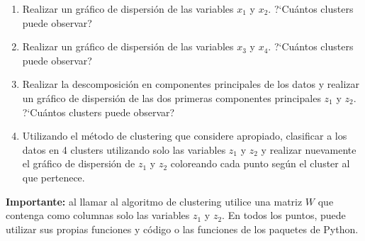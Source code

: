\documentclass[12pt]{article}
\begin{document}
\begin{enumerate}
\begin{enumerate}
\item Realizar un gr\'afico de dispersi\'on de las variables $x_1$ y $x_2$. ?`Cu\'antos clusters puede observar?
\item Realizar un gr\'afico de dispersi\'on de las variables $x_3$ y $x_4$. ?`Cu\'antos clusters puede observar?
\item Realizar la descomposici\'on en componentes principales de los datos y realizar un gr\'afico de dispersi\'on de las dos primeras componentes principales $z_1$ y $z_2$. ?`Cu\'antos clusters puede observar?
\item Utilizando el m\'etodo de clustering que considere apropiado, clasificar a los datos en 4 clusters utilizando solo las variables $z_1$ y $z_2$ y realizar nuevamente el gr\'afico de dispersi\'on de $z_1$ y $z_2$ coloreando cada punto seg\'un el cluster al que pertenece.
\end{enumerate}
\textbf{Importante:} al llamar al algoritmo de clustering utilice una matriz $W$ que contenga como columnas solo las variables $z_1$ y $z_2$.
En todos los puntos, puede utilizar sus propias funciones y c\'odigo o las funciones de los paquetes de Python.


\end{enumerate}
\end{document}
